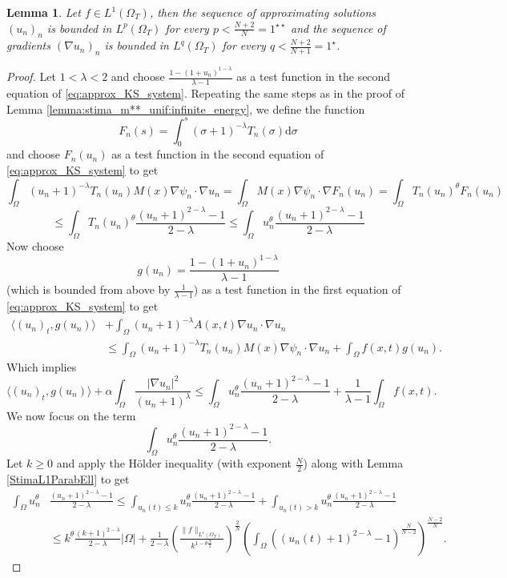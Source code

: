\documentclass{amsart}
\numberwithin{equation}{section}
\newtheorem{lemma}[example]{Lemma}
\def\elleomT#1{L^{#1}(\Omega_T)}
\def\io{\int_\Omega}
\def\norma#1#2{ \|#1 \|_{#2}}
\newcommand{\abs}[1]{\left|#1\right|}
\begin{document}
\begin{lemma}\label{lemma:stima1**}
    Let $f\in\elleomT1$, then the sequence of approximating solutions $(u_n)_n$ is bounded in $\elleomT p$ for every $p<\frac{N+2}{N}=1^{\star\star}$ and the sequence of gradients $(\nabla u_n)_n$ is bounded in $\elleomT q$ for every $q<\frac{N+2}{N+1}=1^{\star}$.
\end{lemma}
\begin{proof}
    Let $1<\lambda<2$ and choose $\frac{1-(1+u_n)^{1-\lambda}}{\lambda-1}$ as a test function in the second equation of \eqref{eq:approx_KS_system}. Repeating the same steps as in the proof of Lemma \ref{lemma:stima_m**_unif:infinite_energy}, we define the function
    $$F_n(s)=\int_0^s (\sigma+1)^{-\lambda}T_n(\sigma) \mathrm{d}\sigma$$
    and choose $F_n(u_n)$ as a test function in the second equation of \eqref{eq:approx_KS_system} to get
    $$
    \io (u_n+1)^{-\lambda}T_n(u_n) M(x)\nabla \psi_n\cdot\nabla u_n 
    =
    \io M(x)\nabla \psi_n\cdot\nabla F_n(u_n)
    =
    \io T_n(u_n)^\theta F_n(u_n)
    $$
    $$
    \leq \io T_n(u_n)^\theta \frac{(u_n+1)^{2-\lambda}-1}{2-\lambda}
    \leq
    \io u_n^{\theta} \frac{(u_n+1)^{2-\lambda}-1}{2-\lambda}
    $$
    Now choose 
    $$g(u_n)=\frac{1-(1+u_n)^{1-\lambda}}{\lambda-1}$$
    (which is bounded from above by $\frac{1}{\lambda-1}$) as a test function in the first equation of \eqref{eq:approx_KS_system} to get
\begin{equation}\label{eq:proof:stima1**:eq0}
    \begin{split}
            \langle (u_n)_t,g(u_n)\rangle&
    +\io(u_n+1)^{-\lambda}A(x,t)\nabla u_n \cdot \nabla u_n\\&
    \leq
    \io (u_n+1)^{-\lambda}T_n(u_n) M(x)\nabla \psi_n\cdot\nabla u_n 
    +\io f(x,t)g(u_n).
    \end{split}
\end{equation}
    Which implies
    \begin{equation}\label{EQ_stimagrad_Parabell_fL1}
        \langle (u_n)_t,g(u_n)\rangle+\alpha\io\frac{\abs{\nabla u_n}^2}{(u_n+1)^{\lambda}}
        \leq
        \io u_n^{\theta} \frac{(u_n+1)^{2-\lambda}-1}{2-\lambda}+\frac{1}{\lambda-1}\io f(x,t).        
    \end{equation}
    We now focus on the term
    $$\io u_n^{\theta} \frac{(u_n+1)^{2-\lambda}-1}{2-\lambda}.$$
    Let $k\geq0$ and apply the H\"older inequality (with exponent $\frac{N}{2}$) along with Lemma \ref{StimaL1ParabEll} to get
    \begin{equation}\label{eq:proof:stima1**:eq1}
        \begin{split}
            \io u_n^{\theta} &\frac{(u_n+1)^{2-\lambda}-1}{2-\lambda}
    \leq \int_{u_n(t)\leq k} u_n^{\theta} \frac{(u_n+1)^{2-\lambda}-1}{2-\lambda} + 
    \int_{u_n(t)> k} u_n^{\theta} \frac{(u_n+1)^{2-\lambda}-1}{2-\lambda}\\
    &\leq
    k^{\theta}\frac{(k+1)^{2-\lambda}}{2-\lambda}\abs{\Omega}+\frac{1}{2-\lambda}
    \left(\frac{\norma{f}{\elleomT1}}{k^{1-\theta\frac{N}{2}}}\right)^\frac{2}{N}
    \left(\io \left((u_n(t)+1)^{2-\lambda}-1\right)^{\frac{N}{N-2}}\right)^{\frac{N-2}{N}}.
        \end{split}
    \end{equation}
    

\end{proof}
\end{document}

